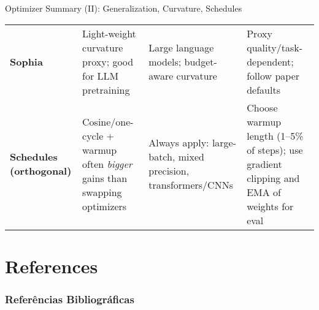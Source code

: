 \documentclass{beamer}
\begin{document}
\begin{frame}{Optimizer Summary (II): Generalization, Curvature, Schedules}
\begin{tabular}{p{2.8cm} p{4.3cm} p{4.5cm} p{3.5cm}}
\textbf{Sophia} &
Light-weight curvature proxy; good for LLM pretraining &
Large language models; budget-aware curvature &
Proxy quality/task-dependent; follow paper defaults \\

\textbf{Schedules (orthogonal)} &
Cosine/one-cycle + warmup often \emph{bigger} gains than swapping optimizers &
Always apply: large-batch, mixed precision, transformers/CNNs &
Choose warmup length (1–5\% of steps); use gradient clipping and EMA of weights for eval \\
\end{tabular}
\end{frame}


\section{References} 
\begin{frame}[allowframebreaks]
        \frametitle{Referências Bibliográficas} 
        
        
\end{frame}


\backmatter
\end{document}
